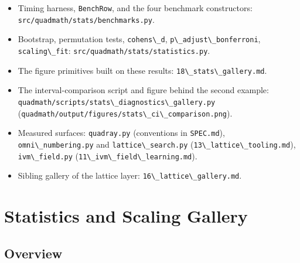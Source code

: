 \documentclass[
  10pt,
]{article}
\newcommand{\passthrough}[1]{#1}
\providecommand{\tightlist}{%
  \setlength{\itemsep}{0pt}\setlength{\parskip}{0pt}}
\begin{document}
\begin{itemize}
\tightlist
\item
  Timing harness, \passthrough{\lstinline!BenchRow!}, and the four
  benchmark constructors:
  \passthrough{\lstinline!src/quadmath/stats/benchmarks.py!}.
\item
  Bootstrap, permutation tests, \passthrough{\lstinline!cohens\_d!},
  \passthrough{\lstinline!p\_adjust\_bonferroni!},
  \passthrough{\lstinline!scaling\_fit!}:
  \passthrough{\lstinline!src/quadmath/stats/statistics.py!}.
\item
  The figure primitives built on these results:
  \passthrough{\lstinline!18\_stats\_gallery.md!}.
\item
  The interval-comparison script and figure behind the second example:
  \passthrough{\lstinline!quadmath/scripts/stats\_diagnostics\_gallery.py!}
  (\passthrough{\lstinline!quadmath/output/figures/stats\_ci\_comparison.png!}).
\item
  Measured surfaces: \passthrough{\lstinline!quadray.py!} (conventions
  in \passthrough{\lstinline!SPEC.md!}),
  \passthrough{\lstinline!omni\_numbering.py!} and
  \passthrough{\lstinline!lattice\_search.py!}
  (\passthrough{\lstinline!13\_lattice\_tooling.md!}),
  \passthrough{\lstinline!ivm\_field.py!}
  (\passthrough{\lstinline!11\_ivm\_field\_learning.md!}).
\item
  Sibling gallery of the lattice layer:
  \passthrough{\lstinline!16\_lattice\_gallery.md!}.
\end{itemize}

\newpage

\section{Statistics and Scaling
Gallery}\label{statistics-and-scaling-gallery}

\subsection{Overview}\label{overview-11}
\end{document}

